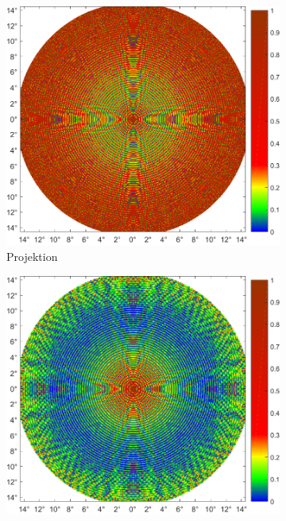 \begin{figure} %
	\centering
	\begin{subfigure}[b]{0.48\textwidth}
		\includegraphics[width=\textwidth]{images/fig_sim_relerror_FTproj-r100-bd1e-3.pdf}
		\caption{Projektion}
	\end{subfigure}\hfill
	\begin{subfigure}[b]{0.48\textwidth}
		\includegraphics[width=\textwidth]{images/fig_sim_relerror_msft-r100-bd1e-3.pdf}

\end{subfigure}
\end{figure}
